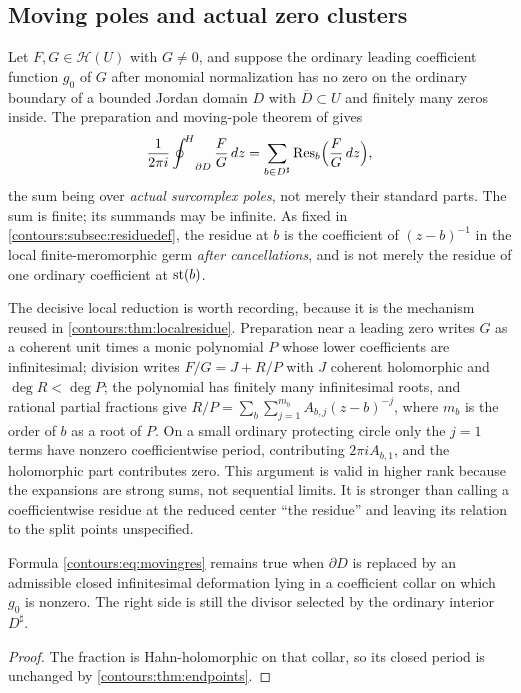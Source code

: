 \documentclass[11pt,letterpaper]{article}
\theoremstyle{definition}
\theoremstyle{remark}
\newcommand{\HH}{\mathcal H}\newcommand{\A}{\mathscr A}\newcommand{\OO}{\mathcal O}
\newcommand{\HCoint}{\mathop{\oint^{\!H}}\nolimits}
\newcommand{\sh}{^{\sharp}}\newcommand{\dd}{\,d}
\numberwithin{equation}{section}
\begin{document}
\subsection{Moving poles and actual zero clusters}
Let $F,G\in\HH(U)$ with $G\ne0$, and suppose the ordinary leading coefficient
function $g_0$ of $G$ after monomial normalization has no zero on the ordinary
boundary of a bounded Jordan domain $D$ with $\overline D\subset U$ and finitely
many zeros inside. The preparation and moving-pole theorem of \cite{Analysis} gives
\begin{equation}\label{contours:eq:movingres}
  \frac1{2\pi i}\HCoint_{\partial D}\frac FG\dd z
  =\sum_{b\in D\sh}\Res_b\Bigl(\frac FG\dd z\Bigr),
\end{equation}
the sum being over \emph{actual surcomplex poles}, not merely their standard parts.
The sum is finite; its summands may be infinite. As fixed in
\cref{contours:subsec:residuedef}, the residue at $b$ is the coefficient of
$(z-b)^{-1}$ in the local finite-meromorphic germ \emph{after cancellations}, and is
not merely the residue of one ordinary coefficient at $\operatorname{st}(b)$.

The decisive local reduction is worth recording, because it is the mechanism reused
in \cref{contours:thm:localresidue}. Preparation near a leading zero writes $G$ as a
coherent unit times a monic polynomial $P$ whose lower coefficients are
infinitesimal; division writes $F/G=J+R/P$ with $J$ coherent holomorphic and
$\deg R<\deg P$; the polynomial has finitely many infinitesimal roots, and rational
partial fractions give $R/P=\sum_b\sum_{j=1}^{m_b}A_{b,j}(z-b)^{-j}$, where $m_b$ is
the order of $b$ as a root of $P$. On a small ordinary protecting circle only the
$j=1$ terms have nonzero coefficientwise period, contributing $2\pi iA_{b,1}$, and
the holomorphic part contributes zero. This argument is valid in higher rank because
the expansions are strong sums, not sequential limits. It is stronger than calling a
coefficientwise residue at the reduced center ``the residue'' and leaving its
relation to the split points unspecified.

\begin{corollary}
\label{contours:cor:deformedres}
Formula \eqref{contours:eq:movingres} remains true when $\partial D$ is replaced by
an admissible closed infinitesimal deformation lying in a coefficient collar on
which $g_0$ is nonzero. The right side is still the divisor selected by the ordinary
interior $D\sh$.
\end{corollary}
\begin{proof}
The fraction is Hahn-holomorphic on that collar, so its closed period is unchanged
by \cref{contours:thm:endpoints}.
\end{proof}
\end{document}
